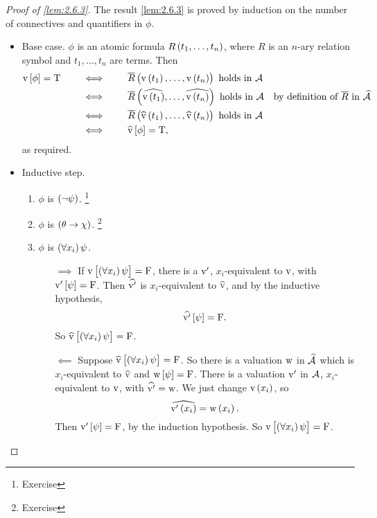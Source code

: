 \begin{proof}[Proof of \ref{lem:2.6.3}]
The result \ref{lem:2.6.3} is proved by induction on the number of connectives and quantifiers in $ \phi $.
\begin{itemize}
\item Base case. $ \phi $ is an atomic formula $ R\br{t_1, \dots, t_n} $, where $ R $ is an $ n $-ary relation symbol and $ t_1, \dots, t_n $ are terms. Then
\begin{align*}
\v\sbr{\phi} = \T \qquad
& \iff \qquad \overline{R}\br{\v\br{t_1}, \dots, \v\br{t_n}} \ \text{holds in} \ \AAA \\
& \iff \qquad \overline{R}\br{\widehat{\v\br{t_1}}, \dots, \widehat{\v\br{t_n}}} \ \text{holds in} \ \AAA & \text{by definition of} \ \overline{R} \ \text{in} \ \widehat{\AAA} \\
& \iff \qquad \overline{R}\br{\widehat{\v}\br{t_1}, \dots, \widehat{\v}\br{t_n}} \ \text{holds in} \ \AAA \\
& \iff \qquad \widehat{\v}\sbr{\phi} = \T,
\end{align*}
as required.
\item Inductive step.
\begin{enumerate}[leftmargin=0.5in, label=Case \arabic*.]
\item $ \phi $ is $ \notb{\psi} $. \footnote{Exercise}
\item $ \phi $ is $ \impb{\theta}{\chi} $. \footnote{Exercise}
\item $ \phi $ is $ \fab{x_i}\psi $.
\begin{itemize}
\item[$ \implies $] If $ \v\sbr{\fab{x_i}\psi} = \F $, there is a $ \mathrm{v}' $, $ x_i $-equivalent to $ \mathrm{v} $, with $ \v'\sbr{\psi} = \F $. Then $ \widehat{\mathrm{v}'} $ is $ x_i $-equivalent to $ \widehat{\mathrm{v}} $, and by the inductive hypothesis,
$$ \widehat{\v'}\sbr{\psi} = \F. $$
So $ \widehat{\v}\sbr{\fab{x_i}\psi} = \F $.
\item[$ \impliedby $] Suppose $ \widehat{\v}\sbr{\fab{x_i}\psi} = \F $. So there is a valuation $ \mathrm{w} $ in $ \widehat{\mathcal{A}} $ which is $ x_i $-equivalent to $ \widehat{\mathrm{v}} $ and $ \w\sbr{\psi} = \F $. There is a valuation $ \mathrm{v}' $ in $ \mathcal{A} $, $ x_i $-equivalent to $ \mathrm{v} $, with $ \widehat{\mathrm{v}'} = \mathrm{w} $. We just change $ \v\br{x_i} $, so
$$ \widehat{\v'\br{x_i}} = \w\br{x_i}. $$
Then $ \v'\sbr{\psi} = \F $, by the induction hypothesis. So $ \v\sbr{\fab{x_i}\psi} = \F $.
\end{itemize}
\end{enumerate}
\end{itemize}
\end{proof}

